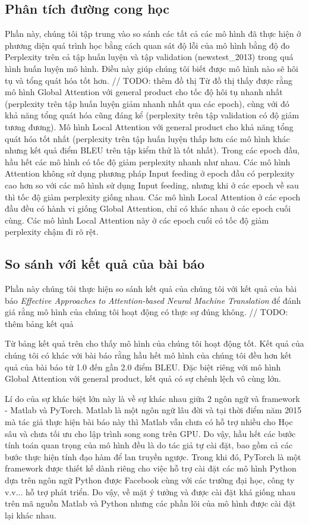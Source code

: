 \subsection{Phân tích đường cong học}
Phần này, chúng tôi tập trung vào so sánh các tất cả các mô hình đã thực hiện ở phương diện quá trình học bằng cách quan sát độ lỗi của mô hình bằng độ đo Perplexity trên cả tập huấn luyện và tập validation (newstest\_2013) trong quá hình huấn luyện mô hình. Điều này giúp chúng tôi biết được mô hình nào sẽ hôi tụ và tổng quát hóa tốt hơn.
// TODO: thêm đồ thị
Từ đồ thị thấy được rằng mô hình Global Attention với general product cho tốc độ hôi tụ nhanh nhất (perplexity trên tập huấn luyện giảm nhanh nhất qua các epoch), cùng với đó khả năng tổng quát hóa cũng đáng kể (perplexity trên tập validation có độ giảm tương đương). Mô hình Local Attention với general product cho khả năng tổng quát hóa tốt nhất (perplexity trên tập huấn luyện thấp hơn các mô hình khác nhưng kết quả điểm BLEU trên tập kiểm thử là tốt nhất). Trong các epoch đầu, hầu hết các mô hình có tốc độ giảm perplexity nhanh như nhau. Các mô hình Attention không sử dụng phương pháp Input feeding ở epoch đầu có perplexity cao hơn so với các mô hình sử dụng Input feeding, nhưng khi ở các epoch về sau thì tốc độ giảm perplexity giống nhau. Các mô hình Local Attention ở các epoch đầu đều có hành vi giống Global Attention, chỉ có khác nhau ở các epoch cuối cùng. Các mô hình Local Attention này ở các epoch cuối có tốc độ giảm perplexity chậm đi rõ rệt.

\subsection{So sánh với kết quả của bài báo}
Phần này chúng tôi thực hiện so sánh kết quả của chúng tôi với kết quả của bài báo \textit{Effective Approaches to Attention-based Neural Machine Translation} để đánh giá rằng mô hình của chúng tôi hoạt động có thực sự đúng không.
// TODO: thêm bảng kết quả

Từ bảng kết quả trên cho thấy mô hình của chúng tôi hoạt động tốt. Kết quả của chúng tôi có khác với bài báo rằng hầu hết mô hình của chúng tôi đều hơn kết quả của bài báo từ 1.0 đến gần 2.0 điểm BLEU. Đặc biệt riêng với mô hình Global Attention với general product, kết quả có sự chênh lệch vô cùng lớn.

Lí do của sự khác biệt lớn này là về sự khác nhau giữa 2 ngôn ngữ và framework - Matlab và PyTorch. Matlab là một ngôn ngữ lâu đời và tại thời điểm năm 2015 mà tác giả thực hiện bài báo này thì Matlab vẫn chưa có hỗ trợ nhiều cho Học sâu và chưa tối ưu cho lập trình song song trên GPU. Do vậy, hầu hết các bước tính toán quan trọng của mô hình đều là do tác giả tự cài đặt, bao gồm cả các bước thực hiện tính đạo hàm để lan truyền ngược. Trong khi đó, PyTorch là một framework được thiết kế dành riêng cho việc hỗ trợ cài đặt các mô hình Python dựa trên ngôn ngữ Python được Facebook cùng với các trường đại học, công ty v.v... hỗ trợ phát triển. Do vậy, về mặt ý tưởng và được cài đặt khá giống nhau trên mã nguồn Matlab và Python nhưng các phần lõi của mô hình được cài đặt lại khác nhau.

